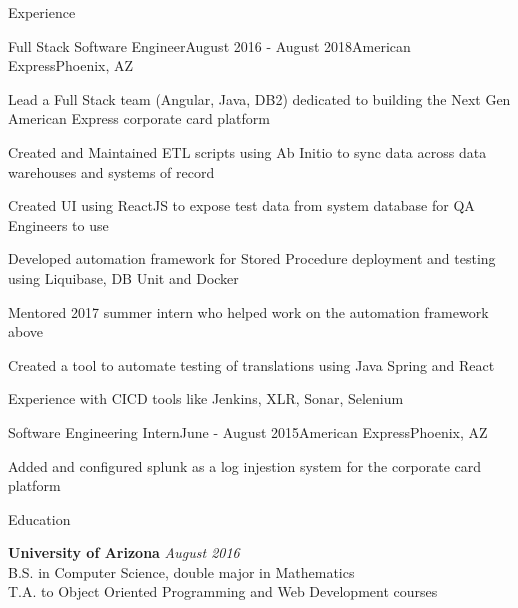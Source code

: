 \documentclass{resume} %
\begin{document}
\begin{rSection}{Experience}
\begin{rSubsection}{Full Stack Software Engineer}{August 2016 - August 2018}{American Express}{Phoenix, AZ}
\item Lead a Full Stack team (Angular, Java, DB2) dedicated to building the Next Gen American Express corporate card platform
\item Created and Maintained ETL scripts using Ab Initio to sync data across data warehouses and systems of record
\item Created UI using ReactJS to expose test data from system database for QA Engineers to use
\item Developed automation framework for Stored Procedure deployment and testing using Liquibase, DB Unit and Docker
\item Mentored 2017 summer intern who helped work on the automation framework above

\item Created a tool to automate testing of translations using Java Spring and React
\item Experience with CICD tools like Jenkins, XLR, Sonar, Selenium
\end{rSubsection}

\begin{rSubsection}{Software Engineering Intern}{June - August 2015}{American Express}{Phoenix, AZ}
\item Added and configured splunk as a log injestion system for the corporate card platform

\end{rSubsection}

\end{rSection}

\begin{rSection}{Education}
	
	{\bf University of Arizona} \hfill {\em August 2016} \\ 
	B.S. in Computer Science, double major in Mathematics  \smallskip \\
	\smallskip T.A. to Object Oriented Programming and Web Development courses
\end{rSection}
\end{document}

